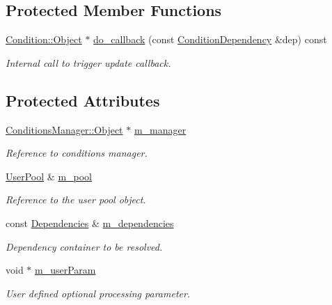 \subsection*{Protected Member Functions}
\begin{DoxyCompactItemize}
\item 
\hyperlink{class_d_d4hep_1_1_conditions_1_1_interna_1_1_condition_object}{Condition::Object} $\ast$ \hyperlink{class_d_d4hep_1_1_conditions_1_1_conditions_dependency_handler_a9095116249b08e3a37ae0dfa4d94a140}{do\_\-callback} (const \hyperlink{class_d_d4hep_1_1_conditions_1_1_condition_dependency}{ConditionDependency} \&dep) const 
\begin{DoxyCompactList}\small\item\em Internal call to trigger update callback. \item\end{DoxyCompactList}\end{DoxyCompactItemize}
\subsection*{Protected Attributes}
\begin{DoxyCompactItemize}
\item 
\hyperlink{class_d_d4hep_1_1_conditions_1_1_conditions_manager_object}{ConditionsManager::Object} $\ast$ \hyperlink{class_d_d4hep_1_1_conditions_1_1_conditions_dependency_handler_a9c245445c4fd8c00c7e80ff67eb1ab3a}{m\_\-manager}
\begin{DoxyCompactList}\small\item\em Reference to conditions manager. \item\end{DoxyCompactList}\item 
\hyperlink{class_d_d4hep_1_1_conditions_1_1_user_pool}{UserPool} \& \hyperlink{class_d_d4hep_1_1_conditions_1_1_conditions_dependency_handler_a71ec45fb6d8dabbf7e055687ab8bea5a}{m\_\-pool}
\begin{DoxyCompactList}\small\item\em Reference to the user pool object. \item\end{DoxyCompactList}\item 
const \hyperlink{class_d_d4hep_1_1_conditions_1_1_conditions_dependency_collection}{Dependencies} \& \hyperlink{class_d_d4hep_1_1_conditions_1_1_conditions_dependency_handler_a8ee531f77ba4feb9f1c767f59d0f607a}{m\_\-dependencies}
\begin{DoxyCompactList}\small\item\em Dependency container to be resolved. \item\end{DoxyCompactList}\item 
void $\ast$ \hyperlink{class_d_d4hep_1_1_conditions_1_1_conditions_dependency_handler_a0566a51b0e547abb517f162cf90a6db0}{m\_\-userParam}
\begin{DoxyCompactList}\small\item\em User defined optional processing parameter. \item\end{DoxyCompactList}\end{DoxyCompactItemize}



